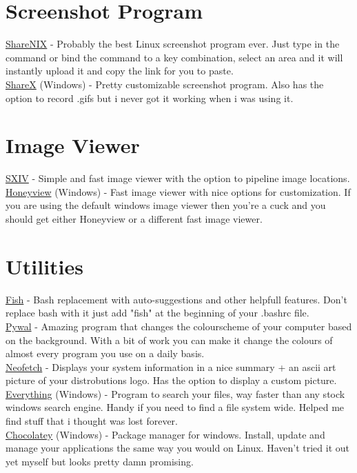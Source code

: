\documentclass{article}
\begin{document}
\section{Screenshot Program}
	\href{https://github.com/Francesco149/sharenix}{ShareNIX} - Probably the best Linux screenshot program ever. Just type in the command or bind the command to a key combination, select an area and it will instantly upload it and copy the link for you to paste.\\
	\href{https://getsharex.com/}{ShareX} (Windows) - Pretty customizable screenshot program. Also has the option to record .gifs but i never got it working when i was using it.
\section{Image Viewer}
	\href{https://github.com/muennich/sxiv}{SXIV} - Simple and fast image viewer with the option to pipeline image locations.\\
	\href{http://www.bandisoft.com/honeyview/}{Honeyview} (Windows) - Fast image viewer with nice options for customization. If you are using the default windows image viewer then you're a cuck and you should get either Honeyview or a different fast image viewer.
\section{Utilities}
	\href{https://fishshell.com/}{Fish} - Bash replacement with auto-suggestions and other helpfull features. Don't replace bash with it just add "fish" at the beginning of your .bashrc file.\\
	\href{https://github.com/dylanaraps/pywal}{Pywal} - Amazing program that changes the colourscheme of your computer based on the background. With a bit of work you can make it change the colours of almost every program you use on a daily basis.\\
	\href{https://github.com/dylanaraps/neofetch}{Neofetch} - Displays your system information in a nice summary + an ascii art picture of your distrobutions logo. Has the option to display a custom picture.\\
	\href{https://www.voidtools.com/}{Everything} (Windows) - Program to search your files, way faster than any stock windows search engine. Handy if you need to find a file system wide. Helped me find stuff that i thought was lost forever.\\
	\href{https://chocolatey.org/}{Chocolatey} (Windows) - Package manager for windows. Install, update and manage your applications the same way you would on Linux. Haven't tried it out yet myself but looks pretty damn promising.
\end{document}
